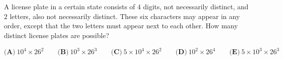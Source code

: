 A license plate in a certain state consists of $4$ digits, not necessarily distinct, and $2$ letters, also not necessarily distinct. These six characters may appear in any order, except that the two letters must appear next to each other. How many distinct license plates are possible?

$\textbf{(A)}\ 10^4\times26^2\qquad\textbf{(B)}\ 10^3\times26^3\qquad\textbf{(C)}\ 5\times10^4\times26^2\qquad\textbf{(D)}\ 10^2\times26^4\qquad\textbf{(E)}\ 5\times10^3\times26^3$
